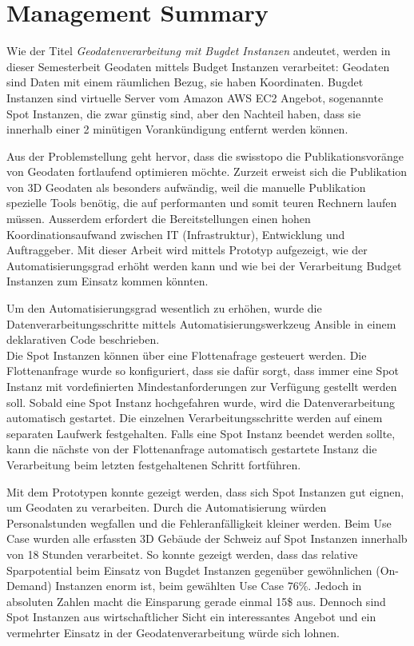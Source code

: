 \section{Management Summary}
Wie der Titel \emph{Geodatenverarbeitung mit Bugdet Instanzen} andeutet, werden in dieser Semesterbeit Geodaten mittels Budget Instanzen verarbeitet: Geodaten sind Daten mit einem räumlichen Bezug, sie haben Koordinaten. Bugdet Instanzen sind virtuelle Server vom Amazon AWS EC2 Angebot, sogenannte Spot Instanzen, die zwar günstig sind, aber den Nachteil haben, dass sie innerhalb einer 2 minütigen Vorankündigung entfernt werden können.

Aus der Problemstellung geht hervor, dass die swisstopo die Publikationsvoränge von Geodaten fortlaufend optimieren möchte. Zurzeit erweist sich die Publikation von 3D Geodaten als besonders aufwändig, weil die manuelle Publikation spezielle Tools benötig, die auf performanten und somit teuren Rechnern laufen müssen. Ausserdem erfordert die Bereitstellungen einen hohen Koordinationsaufwand zwischen IT (Infrastruktur), Entwicklung und Auftraggeber.
Mit dieser Arbeit wird mittels Prototyp aufgezeigt, wie der Automatisierungsgrad erhöht werden kann und wie bei der Verarbeitung Budget Instanzen zum Einsatz kommen könnten.

Um den Automatisierungsgrad wesentlich zu erhöhen, wurde die Datenverarbeitungsschritte mittels Automatisierungswerkzeug Ansible in einem deklarativen Code beschrieben.\\ Die Spot Instanzen können über eine Flottenafrage gesteuert werden. Die Flottenanfrage wurde so konfiguriert, dass sie dafür sorgt, dass immer eine Spot Instanz mit vordefinierten Mindestanforderungen zur Verfügung gestellt werden soll. Sobald eine Spot Instanz hochgefahren wurde, wird die Datenverarbeitung automatisch gestartet.
Die einzelnen Verarbeitungsschritte werden auf einem separaten Laufwerk festgehalten. Falls eine Spot Instanz beendet werden sollte, kann die nächste von der Flottenanfrage automatisch gestartete Instanz die Verarbeitung beim letzten festgehaltenen Schritt fortführen.

Mit dem Prototypen konnte gezeigt werden, dass sich Spot Instanzen gut eignen, um Geodaten zu verarbeiten. Durch die Automatisierung würden Personalstunden wegfallen und die Fehleranfälligkeit kleiner werden. Beim Use Case wurden alle erfassten 3D Gebäude der Schweiz auf Spot Instanzen innerhalb von 18 Stunden verarbeitet.
So konnte gezeigt werden, dass das relative Sparpotential beim Einsatz von Bugdet Instanzen gegenüber gewöhnlichen (On-Demand) Instanzen enorm ist, beim gewählten Use Case 76\%. Jedoch in absoluten Zahlen macht die Einsparung gerade einmal 15\$ aus. Dennoch sind Spot Instanzen aus wirtschaftlicher Sicht ein interessantes Angebot und ein vermehrter Einsatz in der Geodatenverarbeitung würde sich lohnen.

\pagebreak